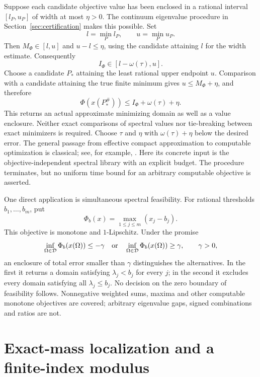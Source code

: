 \documentclass[11pt,reqno]{amsart}
\numberwithin{equation}{section}
\newcommand{\Om}{\Omega}
\begin{document}
Suppose each candidate objective value has been enclosed in a
rational interval $[l_P,u_P]$ of width at most $\eta>0$. The
continuum eigenvalue procedure in Section~\ref{sec:certification}
makes this possible. Set
\[
 l=\min_P l_P,\qquad u=\min_P u_P.
\]
Then $M_\Phi\in[l,u]$ and $u-l\le\eta$, using the candidate
attaining $l$ for the width estimate. Consequently
\begin{equation}\label{obj:interval}
 I_\Phi\in[l-\omega(\tau),u].
\end{equation}
Choose a candidate $P_*$ attaining the least rational upper
endpoint $u$. Comparison with a candidate attaining the true finite
minimum gives $u\le M_\Phi+\eta$, and therefore
\begin{equation}\label{obj:witness}
 \Phi(x(P_*^\#))\le I_\Phi+\omega(\tau)+\eta.
\end{equation}
This returns an actual approximate minimizing domain as well as
a value enclosure. Neither exact comparisons of spectral values
nor tie-breaking between exact minimizers is required. Choose
$\tau$ and $\eta$ with $\omega(\tau)+\eta$ below the desired
error.  The general passage from effective compact approximation
to computable optimization is classical; see, for example,
\cite{ParkEtAl2017}.  Here its concrete input is the
objective-independent spectral library with an explicit budget.
The procedure terminates, but no uniform time bound for an arbitrary
computable objective is asserted.

One direct application is simultaneous spectral feasibility.
For rational thresholds $b_1,\ldots,b_m$, put
\[
 \Phi_b(x)=\max_{1\le j\le m}(x_j-b_j).
\]
This objective is monotone and $1$-Lipschitz. Under the promise
\[
 \inf_{\Om\in\mathcal D}\Phi_b(x(\Om))\le-\gamma
 \quad\hbox{or}\quad
 \inf_{\Om\in\mathcal D}\Phi_b(x(\Om))\ge\gamma,
 \qquad \gamma>0,
\]
an enclosure of total error smaller than $\gamma$ distinguishes
the alternatives. In the first it returns a domain satisfying
$\lambda_j<b_j$ for every $j$; in the second it excludes every
domain satisfying all $\lambda_j\le b_j$. No decision on the
zero boundary of feasibility follows. Nonnegative weighted sums,
maxima and other computable monotone objectives are covered;
arbitrary eigenvalue gaps, signed combinations and ratios are not.



\section{Exact-mass localization and a finite-index modulus}
\label{ims:section}
\end{document}
